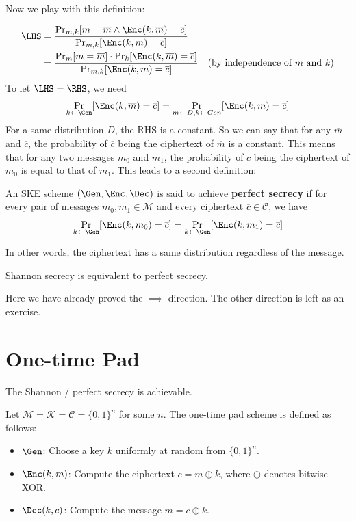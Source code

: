 Now we play with this definition:

\begin{align*}
	\LHS & = \frac{\Pr_{m, k}[m = \overline{m} \wedge \Enc(k,\overline{m}) = \overline{c}]}{\Pr_{m, k}[\Enc(k,m) = \overline{c}]}                                                   \\
	     & = \frac{\Pr_{m}[m = \overline{m}] \cdot \Pr_{k}[\Enc(k,\overline{m}) = \overline{c}]}{\Pr_{m,k}[\Enc(k,m) = \overline{c}]} \quad \text{(by independence of $m$ and $k$)} \\
\end{align*}
To let $\LHS = \RHS$, we need
\[ \Pr_{k\gets \Gen}[\Enc(k,\overline{m}) = \overline{c}] = \Pr_{m\gets D,k\gets Gen}[\Enc(k,m) = \overline{c}] \]
For a same distribution $D$, the RHS is a constant. So we can say that for any $\overline{m}$ and $\overline{c}$, the probability of $\overline{c}$ being the ciphertext of $\overline{m}$ is a constant. This means that for any two messages $m_0$ and $m_1$, the probability of $\overline{c}$ being the ciphertext of $m_0$ is equal to that of $m_1$. This leads to a second definition:

\begin{definition}
	An SKE scheme $(\Gen, \Enc, \Dec)$ is said to achieve \textbf{perfect secrecy} if for every pair of messages $m_0, m_1 \in \mathcal{M}$ and every ciphertext $\overline{c}\in \mathcal C$, we have
	\[
		\Pr_{k\gets \Gen}[\Enc(k,m_0) = \overline{c}] = \Pr_{k\gets \Gen}[\Enc(k,m_1) = \overline{c}]
	\]
\end{definition}

In other words, the ciphertext has a same distribution regardless of the message.

\begin{theorem}
	Shannon secrecy is equivalent to perfect secrecy.
\end{theorem}
Here we have already proved the $\implies$ direction. The other direction is left as an exercise.

\section{One-time Pad}

The Shannon / perfect secrecy is achievable.

\begin{construction}
	Let $\mathcal{M} = \mathcal{K} = \mathcal{C} = \{0,1\}^n$ for some $n$. The one-time pad scheme is defined as follows:
	\begin{itemize}
		\item $\Gen$: Choose a key $k$ uniformly at random from $\{0,1\}^n$.
		\item $\Enc(k, m)$: Compute the ciphertext $c = m \oplus k$, where $\oplus$ denotes bitwise XOR.
		\item $\Dec(k, c)$: Compute the message $m = c \oplus k$.
	\end{itemize}
\end{construction}

